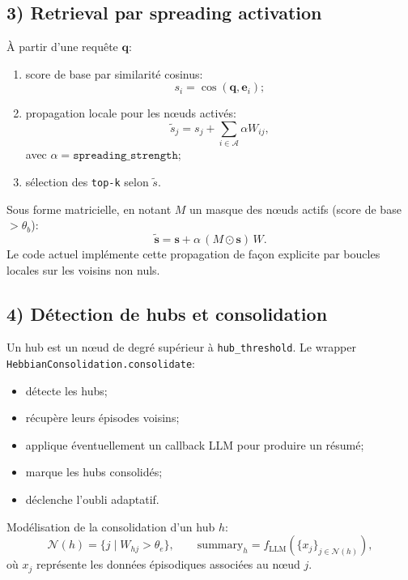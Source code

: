 \documentclass[12pt,a4paper]{article}
\begin{document}
\subsection{3) Retrieval par spreading activation}
À partir d'une requête $\mathbf{q}$:
\begin{enumerate}[leftmargin=*]
    \item score de base par similarité cosinus:
    \begin{equation}
    s_i = \cos(\mathbf{q}, \mathbf{e}_i);
    \end{equation}
    \item propagation locale pour les n\oe uds activés:
    \begin{equation}
    \tilde{s}_j = s_j + \sum_{i \in \mathcal{A}} \alpha W_{ij},
    \end{equation}
    avec $\alpha=\texttt{spreading\_strength}$;
    \item sélection des \texttt{top-k} selon $\tilde{s}$.
\end{enumerate}

Sous forme matricielle, en notant $M$ un masque des n\oe uds actifs (score de base $>\theta_b$):
\begin{equation}
\tilde{\mathbf{s}} = \mathbf{s} + \alpha\,(M \odot \mathbf{s})\,W.
\end{equation}
Le code actuel implémente cette propagation de façon explicite par boucles locales sur les voisins non nuls.

\subsection{4) Détection de hubs et consolidation}
Un hub est un n\oe ud de degré supérieur à \texttt{hub\_threshold}.  
Le wrapper \texttt{HebbianConsolidation.consolidate}:
\begin{itemize}
    \item détecte les hubs;
    \item récupère leurs épisodes voisins;
    \item applique éventuellement un callback LLM pour produire un résumé;
    \item marque les hubs consolidés;
    \item déclenche l'oubli adaptatif.
\end{itemize}

Modélisation de la consolidation d'un hub $h$:
\begin{equation}
\mathcal{N}(h)=\{j \mid W_{hj}>\theta_e\}, \qquad
\text{summary}_h = f_{\text{LLM}}(\{x_j\}_{j \in \mathcal{N}(h)}),
\end{equation}
où $x_j$ représente les données épisodiques associées au n\oe ud $j$.
\end{document}
